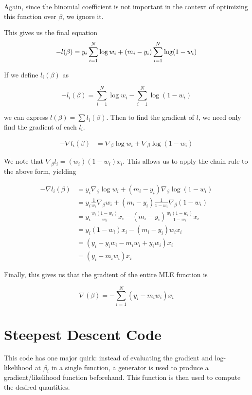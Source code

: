 \documentclass{article}
\begin{document}
Again, since the binomial coefficient is not important in the context of
optimizing this function over $\beta$, we ignore it.

This gives us the final equation
\[
  -l(\beta)= y_i \sum\limits_{i=1}^N \log w_i + (m_i - y_i)\sum\limits_{i=1}^N \log (1 - w_i)\\
\]

If we define $l_i(\beta)$ as 

\[
  -l_i(\beta) = \sum\limits_{i=1}^N \log w_i - \sum\limits_{i=1}^N \log (1 - w_i)
\]

we can express $l(\beta) = \sum l_i(\beta)$. Then to find the gradient of $l$,
we need only find the gradient of each $l_i$.

\begin{align*}
  -\nabla l_i(\beta) &= \nabla_\beta \log w_i + \nabla_\beta\log (1 - w_i)
\end{align*}

We note that $\nabla_\beta l_i = (w_i)(1 - w_i)x_i$. This allows us to apply the
chain rule to the above form, yielding

\begin{align*}
  -\nabla l_i(\beta) &= y_i\nabla_\beta \log w_i + (m_i - y_i)\nabla_\beta\log (1 - w_i)\\
                    &= y_i\frac{1}{w_i} \nabla_\beta w_i + (m_i - y_i)\frac{1}{1 - w_i} \nabla_\beta(1-w_i)\\
                    &= y_i\frac{w_i(1 - w_i)}{w_i} x_i - (m_i - y_i)\frac{w_i(1 - w_i)}{1 - w_i}x_i\\
                    &= y_i (1 - w_i) x_i - (m_i - y_i) w_i x_i\\
                    &= (y_i - y_iw_i - m_iw_i + y_iw_i) x_i\\
                    &= (y_i - m_iw_i) x_i
\end{align*}

Finally, this gives us that the gradient of the entire MLE function is

\[
  \nabla(\beta) = -\sum\limits_{i=1}^N (y_i - m_iw_i) x_i
\]

\section{Steepest Descent Code}

This code has one major quirk: instead of evaluating the gradient and
log-likelihood at $\beta_i$ in a single function, a generator is used to produce
a gradient/likelihood function beforehand. This function is then used to
compute the desired quantities.
\end{document}
